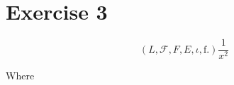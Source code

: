 \section{Exercise 3}

\begin{equation}
  \left(L, \mathcal{F}, F, E, \iota, \mathrm{f}.  \right) \frac{1}{x^2}
  \label{eq:hej}
\end{equation}

Where 
